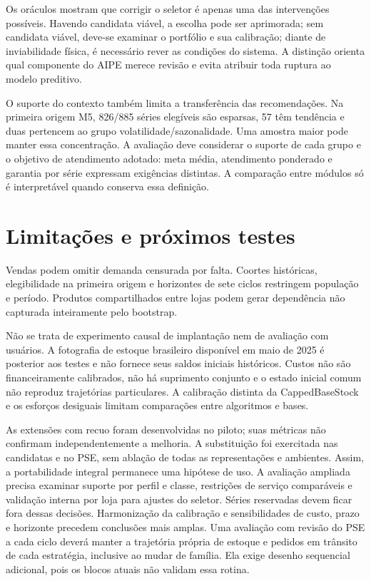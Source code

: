 \documentclass[preprint,12pt]{elsarticle}
\begin{document}
Os oráculos mostram que corrigir o seletor é apenas uma das intervenções possíveis. Havendo candidata viável, a escolha pode ser aprimorada; sem candidata viável, deve-se examinar o portfólio e sua calibração; diante de inviabilidade física, é necessário rever as condições do sistema. A distinção orienta qual componente do AIPE merece revisão e evita atribuir toda ruptura ao modelo preditivo.

O suporte do contexto também limita a transferência das recomendações. Na primeira origem M5, 826/885 séries elegíveis são esparsas, 57 têm tendência e duas pertencem ao grupo volatilidade/sazonalidade. Uma amostra maior pode manter essa concentração. A avaliação deve considerar o suporte de cada grupo e o objetivo de atendimento adotado: meta média, atendimento ponderado e garantia por série expressam exigências distintas. A comparação entre módulos só é interpretável quando conserva essa definição.

\section{Limitações e próximos testes}
Vendas podem omitir demanda censurada por falta. Coortes históricas, elegibilidade na primeira origem e horizontes de sete ciclos restringem população e período. Produtos compartilhados entre lojas podem gerar dependência não capturada inteiramente pelo bootstrap.

Não se trata de experimento causal de implantação nem de avaliação com usuários. A fotografia de estoque brasileiro disponível em maio de 2025 é posterior aos testes e não fornece seus saldos iniciais históricos. Custos não são financeiramente calibrados, não há suprimento conjunto e o estado inicial comum não reproduz trajetórias particulares. A calibração distinta da CappedBaseStock e os esforços desiguais limitam comparações entre algoritmos e bases.

As extensões com recuo foram desenvolvidas no piloto; suas métricas não confirmam independentemente a melhoria. A substituição foi exercitada nas candidatas e no PSE, sem ablação de todas as representações e ambientes. Assim, a portabilidade integral permanece uma hipótese de uso. A avaliação ampliada precisa examinar suporte por perfil e classe, restrições de serviço comparáveis e validação interna por loja para ajustes do seletor. Séries reservadas devem ficar fora dessas decisões. Harmonização da calibração e sensibilidades de custo, prazo e horizonte precedem conclusões mais amplas. Uma avaliação com revisão do PSE a cada ciclo deverá manter a trajetória própria de estoque e pedidos em trânsito de cada estratégia, inclusive ao mudar de família. Ela exige desenho sequencial adicional, pois os blocos atuais não validam essa rotina.
\end{document}
